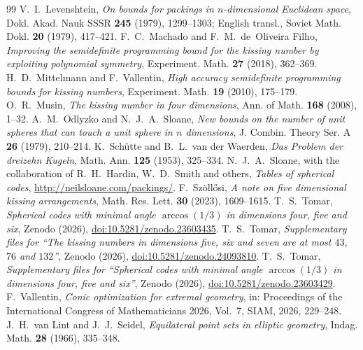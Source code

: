 \documentclass[11pt]{amsart}
\theoremstyle{remark}
\begin{document}
\begin{thebibliography}{99}
 V.~I.~Levenshtein, \emph{On bounds for packings in $n$-dimensional Euclidean space}, Dokl. Akad. Nauk SSSR \textbf{245} (1979), 1299--1303; English transl., Soviet Math. Dokl. \textbf{20} (1979), 417--421.
 F.~C.~Machado and F.~M.~de~Oliveira Filho, \emph{Improving the semidefinite programming bound for the kissing number by exploiting polynomial symmetry}, Experiment. Math. \textbf{27} (2018), 362--369.
 H.~D.~Mittelmann and F.~Vallentin, \emph{High accuracy semidefinite programming bounds for kissing numbers}, Experiment. Math. \textbf{19} (2010), 175--179.
 O.~R.~Musin, \emph{The kissing number in four dimensions}, Ann. of Math. \textbf{168} (2008), 1--32.
 A.~M.~Odlyzko and N.~J.~A.~Sloane, \emph{New bounds on the number of unit spheres that can touch a unit sphere in $n$ dimensions}, J. Combin. Theory Ser. A \textbf{26} (1979), 210--214.
 K.~Sch\"utte and B.~L.~van der Waerden, \emph{Das Problem der dreizehn Kugeln}, Math. Ann. \textbf{125} (1953), 325--334.
 N.~J.~A.~Sloane, with the collaboration of R.~H.~Hardin, W.~D.~Smith and others, \emph{Tables of spherical codes}, \url{http://neilsloane.com/packings/}.
 F.~Sz\"oll\H{o}si, \emph{A note on five dimensional kissing arrangements}, Math. Res. Lett. \textbf{30} (2023), 1609--1615.
 T.~S.~Tomar, \emph{Spherical codes with minimal angle $\arccos(1/3)$ in dimensions four, five and six}, Zenodo (2026), \href{https://doi.org/10.5281/zenodo.23603435}{doi:10.5281/zenodo.23603435}.
 T.~S.~Tomar, \emph{Supplementary files for ``The kissing numbers in dimensions five, six and seven are at most $43$, $76$ and $132$''}, Zenodo (2026), \href{https://doi.org/10.5281/zenodo.24093810}{doi:10.5281/zenodo.24093810}.
 T.~S.~Tomar, \emph{Supplementary files for ``Spherical codes with minimal angle $\arccos(1/3)$ in dimensions four, five and six''}, Zenodo (2026), \href{https://doi.org/10.5281/zenodo.23603429}{doi:10.5281/zenodo.23603429}.
 F.~Vallentin, \emph{Conic optimization for extremal geometry}, in: Proceedings of the International Congress of Mathematicians 2026, Vol.~7, SIAM, 2026, 229--248.
 J.~H.~van Lint and J.~J.~Seidel, \emph{Equilateral point sets in elliptic geometry}, Indag. Math. \textbf{28} (1966), 335--348.
\end{thebibliography}
\end{document}
